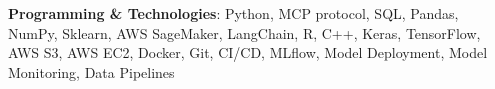 \item \textbf{Programming \& Technologies}: Python, MCP protocol, SQL, Pandas, NumPy, Sklearn, AWS SageMaker, LangChain, R, C++, Keras, TensorFlow, AWS S3, AWS EC2, Docker, Git, CI/CD, MLflow, Model Deployment, Model Monitoring, Data Pipelines
